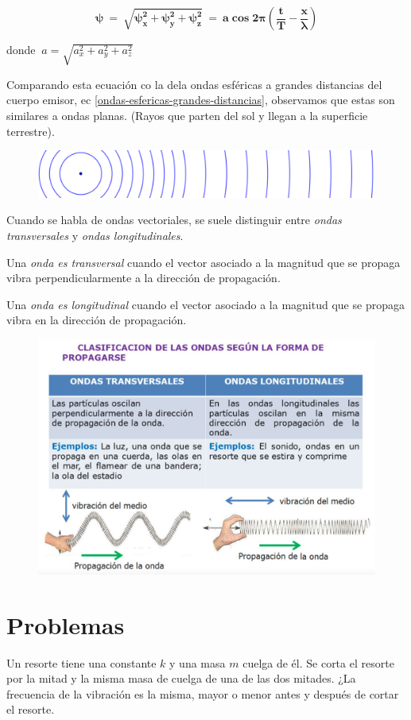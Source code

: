 $$\boldsymbol{\psi\ =\ \sqrt{\psi_x^2+\psi_y^2+\psi_z^2}\ =\ a \cos 2 \pi \left( \dfrac t T - \dfrac x \lambda \right) }$$

donde $ \ a=\sqrt{a_x^2+a_y^2+a_z^2}$

Comparando esta ecuación co la dela ondas esféricas a grandes distancias del cuerpo emisor, ec \ref{ondas-esfericas-grandes-distancias}, observamos que estas son similares a ondas planas. (Rayos que parten del sol y llegan a la superficie terrestre).

\begin{figure}[H]
		\centering
		\includegraphics[width=.75\textwidth]{imagenes/imagenes21/T21IM05.png}
	\end{figure}

Cuando se habla de ondas vectoriales, se suele distinguir entre \emph{ondas transversales} y \emph{ondas longitudinales}.

Una \emph{onda es transversal} cuando el vector asociado a la magnitud que se propaga vibra perpendicularmente a la dirección de propagación.

Una \emph{onda es longitudinal} cuando el vector asociado a la magnitud que se propaga vibra en la dirección de propagación.

\begin{figure}[H]
		\centering
		\includegraphics[width=.9\textwidth]{imagenes/imagenes21/T21IM06.png}
	\end{figure}
	

\section{Problemas}
\vspace{10mm} %
\begin{prob}
Un resorte tiene una constante $k$ y una masa $m$ cuelga de él. Se corta el resorte por la mitad y la misma masa de cuelga de una de las dos mitades. ¿La frecuencia de la vibración es la misma, mayor o menor antes y después de cortar el resorte.	
\end{prob}

